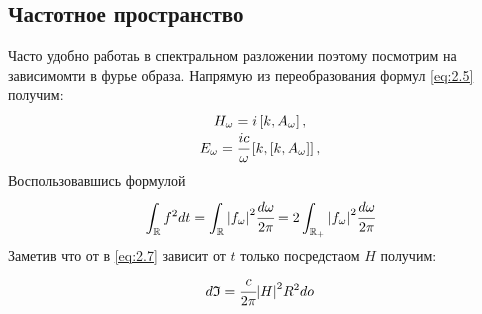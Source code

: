 \subsection{Частотное пространство}

Часто удобно работаь в спектральном разложении поэтому посмотрим 
на зависимомти в фурье образа. Напрямую из переобразования формул 
\ref{eq:2.5} получим:
\begin{gather}
    \begin{matrix}
        H_\omega = i \left[ k, A_\omega \right],\\
        E_\omega = \cfrac{ic}{\omega} \left[ k, \left[ k, A_\omega \right] \right],
    \end{matrix}
\end{gather}
Воспользовавшись формулой 
\begin{equation}
    \int_{\mathbb{R}} f^2 dt = \int_{\mathbb{R}} \abs{f_\omega}^2 \cfrac{d\omega}{2\pi} 
    = 2\int_{\mathbb{R}_+} \abs{f_\omega}^2 \cfrac{d\omega}{2\pi} 
\end{equation}
Заметив что от в \ref{eq:2.7}  зависит от $t$ только посредстаом $H$ 
получим:
\begin{equation}
    d\mathfrak{I} = \cfrac{c}{2\pi} \abs{H}^2R^2do
    \label{eq:if}
\end{equation}
